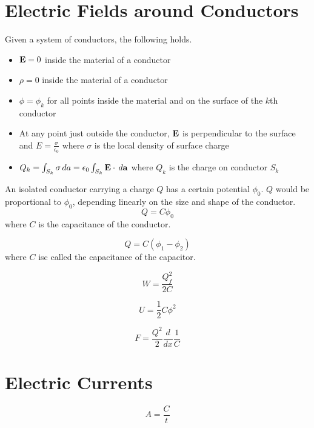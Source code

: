 \documentclass[a4paper]{article}
\begin{document}
\section{Electric Fields around Conductors}
\begin{defn} Given a system of conductors, the following holds. 
\begin{itemize}
\item $\vb{E}=0$ inside the material of a conductor
\item $\rho=0$ inside the material of a conductor
\item $\phi=\phi_k$ for all points inside the material and on the surface of the $k$th conductor
\item At any point just outside the conductor, $\vb{E}$ is perpendicular to the surface and $E=\frac{\sigma}{\epsilon_0}$ where $\sigma$ is the local density of surface charge
\item $Q_k=\int_{S_k}\sigma\,da=\epsilon_0\int_{S_k}\vb{E}\cdot\,d\vb{a}$ where $Q_k$ is the charge on conductor $S_k$
\end{itemize}
\end{defn}

\begin{defn} An isolated conductor carrying a charge $Q$ has a certain potential $\phi_0$. $Q$ would be proportional to $\phi_0$, depending linearly on the size and shape of the conductor. $$Q=C\phi_0$$ where $C$ is the capacitance of the conductor. 
\end{defn}

\begin{defn} $$Q=C(\phi_1-\phi_2)$$ where $C$ isc called the capacitance of the capacitor. 
\end{defn}

\begin{thm} $$W=\frac{Q_f^2}{2C}$$
\end{thm}

\begin{thm} $$U=\frac{1}{2}C\phi^2$$
\end{thm}

\begin{thm} $$F=\frac{Q^2}{2}\frac{d}{dx}\frac{1}{C}$$
\end{thm}

\pagebreak
\section{Electric Currents}
\begin{defn} $$A=\frac{C}{t}$$
\end{defn}
\end{document}
